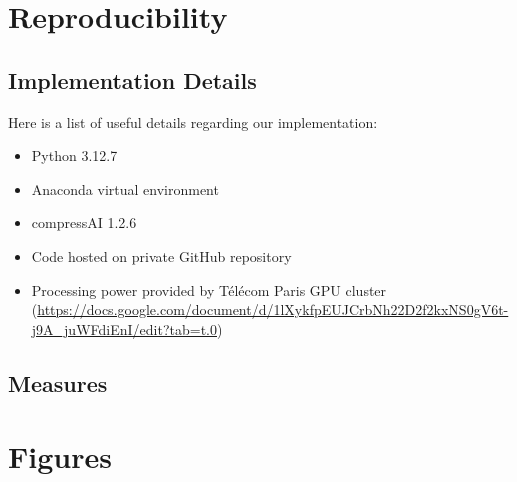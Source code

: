 \appendix

\chapter{Reproducibility}

\section{Implementation Details}
Here is a list of useful details regarding our implementation:
\begin{itemize}
    \item Python 3.12.7
    \item Anaconda virtual environment
    \item compressAI 1.2.6
    \item Code hosted on private GitHub repository
    \item Processing power provided by Télécom Paris GPU cluster (\url{https://docs.google.com/document/d/1lXykfpEUJCrbNh22D2f2kxNS0gV6t-j9A_juWFdiEnI/edit?tab=t.0})
\end{itemize}

\section{Measures}


\chapter{Figures}

